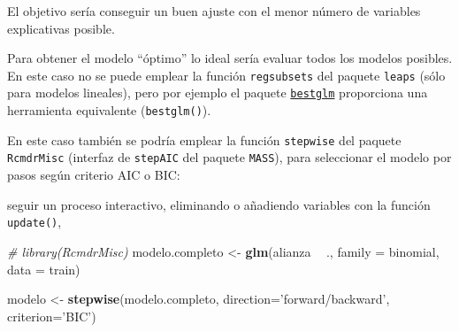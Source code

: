 \documentclass[
  spanish,
]{book}
\newenvironment{Shaded}{\begin{snugshade}}{\end{snugshade}}
\newcommand{\CommentTok}[1]{\textcolor[rgb]{0.56,0.35,0.01}{\textit{#1}}}
\newcommand{\DataTypeTok}[1]{\textcolor[rgb]{0.13,0.29,0.53}{#1}}
\newcommand{\KeywordTok}[1]{\textcolor[rgb]{0.13,0.29,0.53}{\textbf{#1}}}
\newcommand{\NormalTok}[1]{#1}
\newcommand{\OperatorTok}[1]{\textcolor[rgb]{0.81,0.36,0.00}{\textbf{#1}}}
\newcommand{\StringTok}[1]{\textcolor[rgb]{0.31,0.60,0.02}{#1}}
\theoremstyle{break}
\theoremstyle{definition}
\theoremstyle{definition}
\theoremstyle{definition}
\theoremstyle{remark}
\begin{document}
El objetivo sería conseguir un buen ajuste con el menor número de variables explicativas posible.

Para obtener el modelo ``óptimo'' lo ideal sería evaluar todos los modelos posibles.
En este caso no se puede emplear la función \texttt{regsubsets} del paquete \texttt{leaps} (sólo para modelos lineales),
pero por ejemplo el paquete
\href{https://cran.r-project.org/web/packages/bestglm/vignettes/bestglm.pdf}{\texttt{bestglm}}
proporciona una herramienta equivalente (\texttt{bestglm()}).

En este caso también se podría emplear la función \texttt{stepwise} del paquete \texttt{RcmdrMisc} (interfaz de \texttt{stepAIC} del paquete \texttt{MASS}), para seleccionar el modelo por pasos según criterio AIC o BIC:

seguir un proceso interactivo, eliminando o añadiendo variables con la función \texttt{update()},

\begin{Shaded}
\begin{Highlighting}[]
\CommentTok{# library(RcmdrMisc)}
\NormalTok{modelo.completo <-}\StringTok{ }\KeywordTok{glm}\NormalTok{(alianza }\OperatorTok{~}\StringTok{ }\NormalTok{., }\DataTypeTok{family =}\NormalTok{ binomial, }\DataTypeTok{data =}\NormalTok{ train)}

\NormalTok{modelo <-}\StringTok{ }\KeywordTok{stepwise}\NormalTok{(modelo.completo, }\DataTypeTok{direction=}\StringTok{'forward/backward'}\NormalTok{, }\DataTypeTok{criterion=}\StringTok{'BIC'}\NormalTok{)}
\end{Highlighting}
\end{Shaded}
\end{document}
